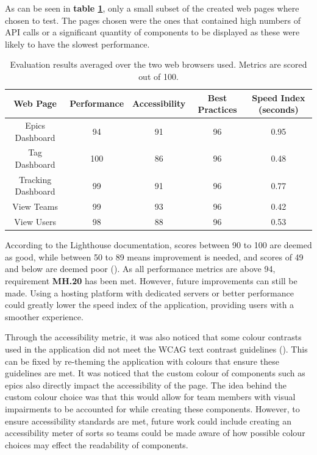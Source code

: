 \documentclass[l4proj.tex]{subfiles}
\begin{document}
As can be seen in \textbf{table \ref{perfomance-metrics-table}}, only a small subset of the created web pages where chosen to test. The pages chosen were the ones that contained high numbers of API calls or a significant quantity of components to be displayed as these were likely to have the slowest performance. 

\begin{center}
\begin{table}[h!]
\caption{Evaluation results averaged over the two web browsers used. Metrics are scored out of 100.}
\label{perfomance-metrics-table}
\begin{tabular}{| c | c | c | c | c |}
\hline
 Web Page & Performance & Accessibility & Best Practices & Speed Index (seconds) \\ 
 \hline
 Epics Dashboard & 94 & 91 & 96 & 0.95 \\  
 Tag Dashboard & 100 & 86 & 96 & 0.48    \\
 Tracking Dashboard  & 99 & 91 & 96 & 0.77  \\
 View Teams & 99 & 93 & 96 & 0.42 \\
 View Users & 98 & 88 & 96 & 0.53\\
 \hline
\end{tabular}
\end{table}
\end{center}

According to the Lighthouse documentation, scores between 90 to 100 are deemed as good, while between 50 to 89 means improvement is needed, and scores of 49 and below are deemed poor (\cite{LighthouseColourCoding}). As all performance metrics are above 94, requirement \textbf{MH.20} has been met. However, future improvements can still be made. Using a hosting platform with dedicated servers or better performance could greatly lower the speed index of the application, providing users with a smoother experience. 

Through the accessibility metric, it was also noticed that some colour contrasts used in the application did not meet the WCAG text contrast guidelines (\cite{WCAGContrastGuidelines}). This can be fixed by re-theming the application with colours that ensure these guidelines are met. It was noticed that the custom colour of components such as epics also directly impact the accessibility of the page. The idea behind the custom colour choice was that this would allow for team members with visual impairments to be accounted for while creating these components. However, to ensure accessibility standards are met, future work could include creating an accessibility meter of sorts so teams could be made aware of how possible colour choices may effect the readability of components.
\end{document}
